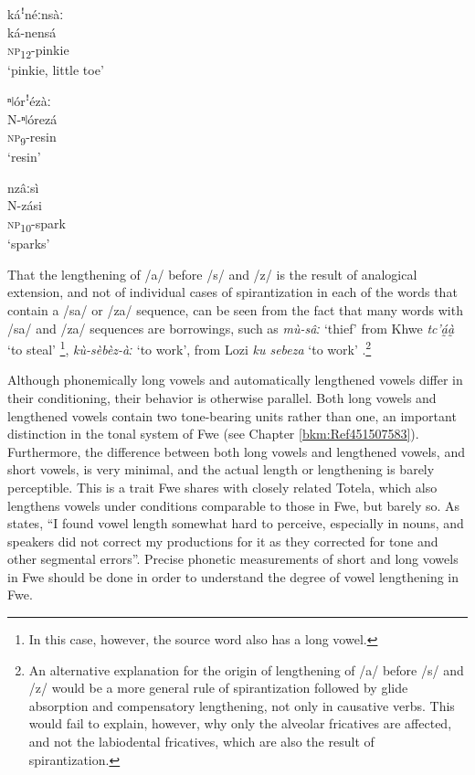 \ea
\glll káꜝnéːnsàː\\
ká-nensá\\
\textsc{np}\textsubscript{12}-pinkie\\
\glt ‘pinkie, little toe’
\z

\ea
\glll ⁿǀórꜝézàː\\
N-ⁿǀórezá\\
\textsc{np}\textsubscript{9}-resin\\
\glt ‘resin’
\z

\ea
\label{bkm:Ref459283678}
\glll nzâːsì\\
N-zási\\
\textsc{np}\textsubscript{10}-spark\\
\glt ‘sparks’
\z

That the lengthening of /a/ before /s/ and /z/ is the result of analogical extension, and not of individual cases of spirantization in each of the words that contain a /sa/ or /za/ sequence, can be seen from the fact that many words with /sa/ and /za/ sequences are borrowings, such as \textit{mù-sâː} ‘thief’ from Khwe \textit{tc’á̰à̰} ‘to steal’ \citep[355]{Kilian-Hatz2003}\footnote{In this case, however, the source word also has a long vowel.}, \textit{kù-sèbèz-àː} ‘to work’, from Lozi \textit{ku sebeza} ‘to work’ \citep[168]{Burger1960}.\footnote{An alternative explanation for the origin of lengthening of /a/ before /s/ and /z/ would be a more general rule of spirantization followed by glide absorption and compensatory lengthening, not only in causative verbs. This would fail to explain, however, why only the alveolar fricatives are affected, and not the labiodental fricatives, which are also the result of spirantization.}

Although phonemically long vowels and automatically lengthened vowels differ in their condi\-tioning, their behavior is otherwise parallel. Both long vowels and lengthened vowels con\-tain two tone-bearing units rather than one, an important distinction in the tonal system of Fwe (see Chapter \ref{bkm:Ref451507583}). Furthermore, the difference between both long vowels and lengthened vowels, and short vowels, is very minimal, and the actual length or lengthening is barely perceptible. This is a trait Fwe shares with closely related Totela, which also lengthens vowels under conditions comparable to those in Fwe, but barely so. As {\citet[71]{Crane2011}} states, “I found vowel length some\-what hard to perceive, especially in nouns, and speakers did not correct my productions for it as they corrected for tone and other segmental errors”. Precise phonetic measurements of short and long vowels in Fwe should be done in order to understand the degree of vowel lengthening in Fwe.

